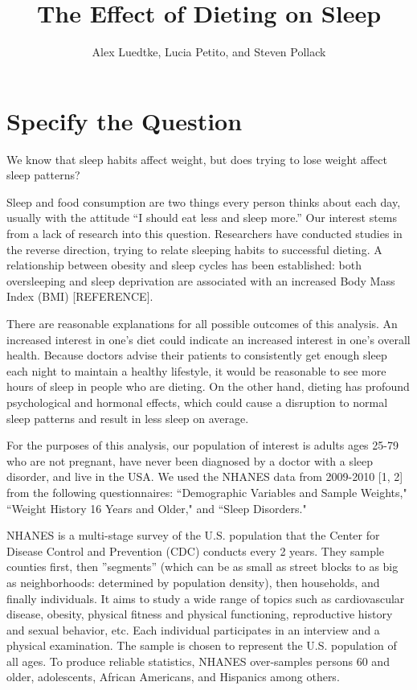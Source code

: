 \documentclass{article}
\begin{document}




\title{\textbf{The Effect of Dieting on Sleep}}
\author{Alex Luedtke, Lucia Petito, and Steven Pollack}
\date{}
\maketitle

\section{Specify the Question}

We know that sleep habits affect weight, but does trying to lose weight affect sleep patterns?

Sleep and food consumption are two things every person thinks about each day, usually with the attitude ``I should eat less and sleep more.''  Our interest stems from a lack of research into this question.  Researchers have conducted studies in the reverse direction, trying to relate sleeping habits to successful dieting.  A relationship between obesity and sleep cycles has been established: both oversleeping and sleep deprivation are associated with an increased Body Mass Index (BMI) [REFERENCE].  

There are reasonable explanations for all possible outcomes of this analysis.  An increased interest in one's diet could indicate an increased interest in one's overall health.  Because doctors advise their patients to consistently get enough sleep each night to maintain a healthy lifestyle, it would be reasonable to see more hours of sleep in people who are dieting.  On the other hand, dieting has profound psychological and hormonal effects, which could cause a disruption to normal sleep patterns and result in less sleep on average.

For the purposes of this analysis, our population of interest is adults ages 25-79 who are not pregnant, have never been diagnosed by a doctor with a sleep disorder, and live in the USA.  We used the NHANES data from 2009-2010 [1, 2] from the following questionnaires: ``Demographic Variables and Sample Weights," ``Weight History 16 Years and Older," and ``Sleep Disorders."

NHANES is a multi-stage survey of the U.S. population that the Center for Disease Control and Prevention (CDC) conducts every 2 years.  They sample counties first, then ''segments'' (which can be as small as street blocks to as big as neighborhoods: determined by population density), then households, and finally individuals.  It aims to study a wide range of topics such as cardiovascular disease, obesity, physical fitness and physical functioning, reproductive history and sexual behavior, etc.  Each individual participates in an interview and a physical examination.  The sample is chosen to represent the U.S. population of all ages.  To produce reliable statistics, NHANES over-samples persons 60 and older, adolescents, African Americans, and Hispanics among others.  
\end{document}
